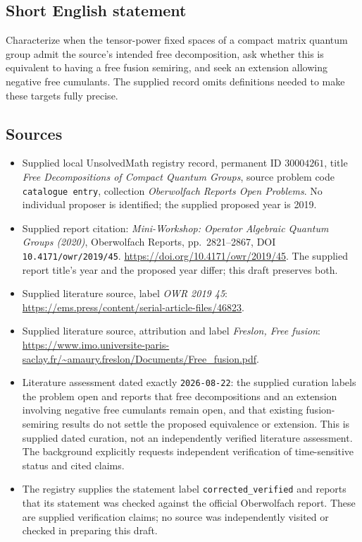 \documentclass[11pt]{article}
\begin{document}
\subsection{Short English statement}
Characterize when the tensor-power fixed spaces of a compact matrix quantum group admit the source's intended free decomposition, ask whether this is equivalent to having a free fusion semiring, and seek an extension allowing negative free cumulants. The supplied record omits definitions needed to make these targets fully precise.
\subsection{Sources}
\begin{itemize}
\item Supplied local UnsolvedMath registry record, permanent ID \(30004261\), title \emph{Free Decompositions of Compact Quantum Groups}, source problem code \texttt{catalogue entry}, collection \emph{Oberwolfach Reports Open Problems}. No individual proposer is identified; the supplied proposed year is 2019.
\item Supplied report citation: \emph{Mini-Workshop: Operator Algebraic Quantum Groups (2020)}, Oberwolfach Reports, pp.\ 2821--2867, DOI \texttt{10.4171/owr/2019/45}. \url{https://doi.org/10.4171/owr/2019/45}. The supplied report title's year and the proposed year differ; this draft preserves both.
\item Supplied literature source, label \emph{OWR 2019 45}: \url{https://ems.press/content/serial-article-files/46823}.
\item Supplied literature source, attribution and label \emph{Freslon, Free fusion}: \url{https://www.imo.universite-paris-saclay.fr/~amaury.freslon/Documents/Free_fusion.pdf}.
\item Literature assessment dated exactly \texttt{2026-08-22}: the supplied curation labels the problem open and reports that free decompositions and an extension involving negative free cumulants remain open, and that existing fusion-semiring results do not settle the proposed equivalence or extension. This is supplied dated curation, not an independently verified literature assessment. The background explicitly requests independent verification of time-sensitive status and cited claims.
\item The registry supplies the statement label \texttt{corrected\_verified} and reports that its statement was checked against the official Oberwolfach report. These are supplied verification claims; no source was independently visited or checked in preparing this draft.
\end{itemize}
\end{document}
